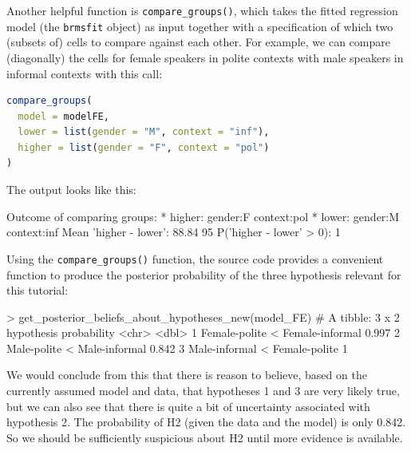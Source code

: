 \documentclass[nobib]{tufte-handout}
\begin{document}
Another helpful function is \texttt{compare\_groups()}, which takes the fitted regression model (the \texttt{brmsfit} object) as input together with a specification of which two (subsets of) cells to compare
against each other. For example, we can compare (diagonally) the cells for female speakers in
polite contexts with male speakers in informal contexts with this call:

\begin{minipage}[]{1.3\textwidth}
\begin{lstlisting}[language=R]
compare_groups(
  model = modelFE, 
  lower = list(gender = "M", context = "inf"),
  higher = list(gender = "F", context = "pol")
)
\end{lstlisting}
\end{minipage}

The output looks like this:

\medskip

\begin{minipage}[]{\textwidth}
\begin{rc}
Outcome of comparing groups:
 * higher:  gender:F context:pol 
 * lower:   gender:M context:inf 
Mean 'higher - lower':  88.84 
95%
P('higher - lower' > 0):  1 
\end{rc}
\end{minipage}

Using the \texttt{compare\_groups()} function, the source code provides a convenient function to
produce the posterior probability of the three hypothesis relevant for this tutorial:

\medskip

\begin{minipage}[]{\textwidth}
\begin{rc}
> get_posterior_beliefs_about_hypotheses_new(model_FE)
# A tibble: 3 x 2
  hypothesis                      probability
  <chr>                                 <dbl>
1 Female-polite < Female-informal       0.997
2 Male-polite < Male-informal           0.842
3 Male-informal < Female-polite         1  
\end{rc}
\end{minipage}

We would conclude from this that there is reason to believe, based on the currently assumed model and data, that hypotheses 1 and 3 are very likely true, but we can also see that there is quite a bit of uncertainty associated with hypothesis 2. The probability of H2 (given the data and the model) is only 0.842. So we should be sufficiently suspicious about H2 until more evidence is available.
\end{document}
